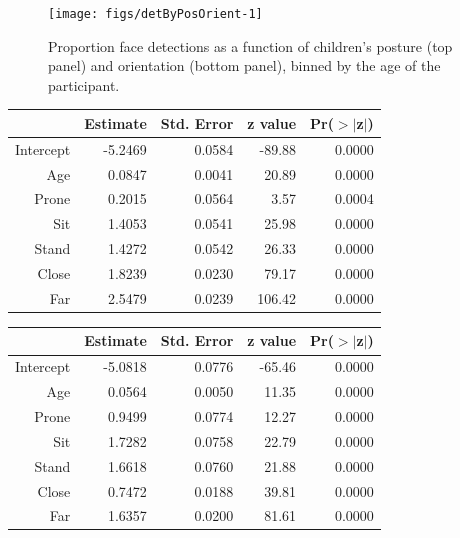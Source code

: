 \documentclass[10pt, letterpaper]{article}
\newenvironment{CodeChunk}{}{}
\begin{document}
\begin{CodeChunk}
\begin{figure}[h]

{\centering \texttt{[image: figs/detByPosOrient-1]} 

}

\caption[Proportion face detections as a function of children's posture (top panel) and orientation (bottom panel), binned by the age of the participant]{Proportion face detections as a function of children's posture (top panel) and orientation (bottom panel), binned by the age of the participant.}\label{fig:detByPosOrient}
\end{figure}
\end{CodeChunk}

\begin{table}[H]
\centering
\begin{tabular}{rrrrr}
  \hline
 & Estimate & Std. Error & z value & Pr($>$$|$z$|$) \\ 
  \hline
Intercept & -5.2469 & 0.0584 & -89.88 & 0.0000 \\ 
  Age & 0.0847 & 0.0041 & 20.89 & 0.0000 \\ 
  Prone & 0.2015 & 0.0564 & 3.57 & 0.0004 \\ 
  Sit & 1.4053 & 0.0541 & 25.98 & 0.0000 \\ 
  Stand & 1.4272 & 0.0542 & 26.33 & 0.0000 \\ 
  Close & 1.8239 & 0.0230 & 79.17 & 0.0000 \\ 
  Far & 2.5479 & 0.0239 & 106.42 & 0.0000 \\ 
   \hline
\end{tabular}
\end{table}

\begin{table}[H]
\centering
\begin{tabular}{rrrrr}
  \hline
 & Estimate & Std. Error & z value & Pr($>$$|$z$|$) \\ 
  \hline
Intercept & -5.0818 & 0.0776 & -65.46 & 0.0000 \\ 
  Age & 0.0564 & 0.0050 & 11.35 & 0.0000 \\ 
  Prone & 0.9499 & 0.0774 & 12.27 & 0.0000 \\ 
  Sit & 1.7282 & 0.0758 & 22.79 & 0.0000 \\ 
  Stand & 1.6618 & 0.0760 & 21.88 & 0.0000 \\ 
  Close & 0.7472 & 0.0188 & 39.81 & 0.0000 \\ 
  Far & 1.6357 & 0.0200 & 81.61 & 0.0000 \\ 
   \hline
\end{tabular}
\end{table}
\end{document}
